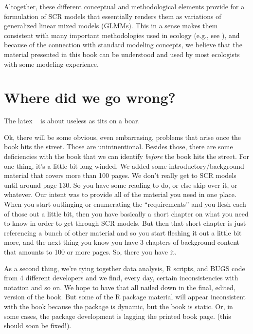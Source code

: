 Altogether, these different conceptual and methodological elements
provide for a formulation of SCR models that essentially renders them
as variations of generalized linear mixed models (GLMMs). This in a
sense makes them consistent with many important methodologies used in
ecology (e.g., see \citet{zuur_etal:2009, kery_etal:2010}), and
because of the connection with standard modeling concepts, we believe
that the material presented in this book can be understood and used by
most ecologists with some modeling experience.








\section*{Where did we go wrong?}

The latex ~ is about useless as tits on a boar.

Ok, there will be some obvious, even embarrasing, problems that arise
once the book hits the street. Those are unintnentional. Besides
those, there are some deficiencies with the book that we can identify
{\it before} the book hits the street. For one thing, it's a little
bit long-winded. We added some introductory/background material that
covers more than 100 pages. We don't really get to SCR models until
around page 130.  So you have some reading to do, or else skip over
it, or whatever. Our intent was to provide all of the material you
need in one place. When you start outlinging or enumerating the
``requirements'' and you flesh each of those out a little bit, then
you have basically a short chapter on what you need to know in order
to get through SCR models. But then that short chapter is just
referencing a bunch of other material and so you start fleshing it out
a little bit more, and the next thing you know you have 3 chapters of
background content that amounts to 100 or more pages.  So, there you
have it.  

As a second thing, we're tying together data analysis, R scripts, and
BUGS code from 4 different developers and we find, every day, certain
inconsistencies with notation and so on. We hope to have that all
nailed down in the final, edited, version of the book. But some of the
R package material will appear inconsistent with the book because the
package is dynamic, but the book is static. Or, in some cases, the
package development is lagging the printed book page. (this should
soon be fixed!). 






